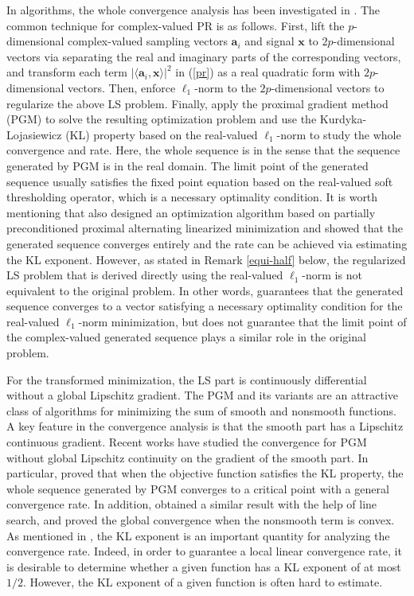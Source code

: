 \documentclass{article}
\numberwithin{equation}{section}
\begin{document}
In algorithms, the whole convergence analysis has been investigated in \cite{pauwels2017fienup,bolte2018first,chang2018variational}. 
The common technique for complex-valued PR is as follows.
First, lift the $p$-dimensional complex-valued sampling vectors $\mathbf{a}_i$ and signal $\mathbf{x}$ to $2p$-dimensional vectors via separating the real and imaginary parts of the corresponding vectors, and transform each term $|\langle \mathbf{a}_i, \mathbf{x}\rangle|^2$ in  (\ref{pr}) as a real quadratic form with $2p$-dimensional vectors. 
Then, enforce $\ell_1$-norm to the $2p$-dimensional vectors to regularize the above LS problem.  
Finally, apply the proximal gradient method (PGM) to solve the resulting optimization problem and use the Kurdyka-Lojasiewicz (KL) property based on the real-valued $\ell_1$-norm to study the whole convergence and rate. 
Here, the whole sequence is in the sense that the sequence generated by PGM is in the real domain. 
The limit point of the  generated sequence usually satisfies the fixed point equation based on the real-valued soft thresholding operator, which is a necessary optimality condition. 
It is worth mentioning that \cite{chang2018variational} also designed an optimization algorithm based on partially preconditioned proximal alternating linearized minimization and showed that the generated sequence converges entirely and the rate can be achieved via estimating the KL exponent. 
However, as stated in Remark \ref{equi-half} below, the regularized LS problem that is derived directly using the real-valued $\ell_1$-norm is not equivalent to the original problem. In other words, \cite{chang2018variational} guarantees that the generated sequence converges to a vector satisfying a necessary optimality condition for the real-valued $\ell_1$-norm minimization, but does not guarantee that the limit point of the complex-valued generated sequence plays a similar role in the original problem.

For the transformed minimization, the LS part is continuously differential without a global Lipschitz gradient. 
The PGM and its variants are an attractive class of algorithms for minimizing the sum of smooth and nonsmooth functions. 
A key feature in the convergence analysis is that the smooth part has a Lipschitz continuous gradient.
Recent works \cite{bolte2018first,kanzow2022convergence,jia2023convergence,takahashi2025approximate} have studied the convergence for PGM without global Lipschitz continuity on the gradient of the smooth part.
In particular, \cite{bolte2018first} proved that when the objective function satisfies the KL property, the whole sequence generated by PGM converges to a critical point with a general convergence rate.
In addition, \cite{jia2023convergence} obtained a similar result with the help of line search, and \cite{takahashi2025approximate} proved the global convergence when the nonsmooth term is convex.
As mentioned in \cite{bolte2018first}, the KL exponent is an important quantity for analyzing the convergence rate. 
Indeed, in order to guarantee a local linear convergence rate, it is desirable to determine whether a given function has a KL exponent of at most $1/2$. However, the KL exponent of a given function is often hard to estimate.
\end{document}
